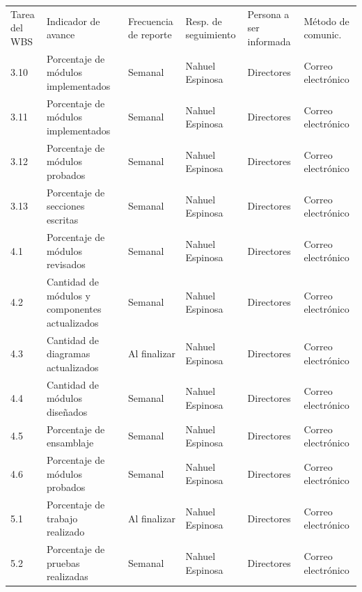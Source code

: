 \documentclass[11pt]{charter}
\begin{document}
\begin{table}[!htpb]
\centering
\begin{tabularx}{\linewidth}{@{}|m{1.5cm}|m{3cm}|X|X|X|X|@{}}
\hline
\rowcolor[HTML]{C0C0C0} 
\multicolumn{6}{|c|}{\cellcolor[HTML]{C0C0C0}SEGUIMIENTO DE AVANCE} \\ \hline
\rowcolor[HTML]{C0C0C0} 
Tarea del WBS & Indicador de avance & Frecuencia de reporte & Resp. de seguimiento & Persona a ser informada & Método de comunic. \\ \hline
 3.10 & Porcentaje de módulos implementados                & Semanal      & Nahuel Espinosa & Directores & Correo electrónico \\ \hline
 3.11 & Porcentaje de módulos implementados              & Semanal      & Nahuel Espinosa & Directores & Correo electrónico \\ \hline
 3.12 & Porcentaje de módulos probados                   & Semanal      & Nahuel Espinosa & Directores & Correo electrónico \\ \hline
 3.13 & Porcentaje de secciones escritas                 & Semanal      & Nahuel Espinosa & Directores & Correo electrónico \\ \hline
 4.1  & Porcentaje de módulos revisados                  & Semanal      & Nahuel Espinosa & Directores & Correo electrónico \\ \hline
 4.2  & Cantidad de módulos y componentes actualizados   & Semanal      & Nahuel Espinosa & Directores & Correo electrónico \\ \hline
 4.3  & Cantidad de diagramas actualizados               & Al finalizar & Nahuel Espinosa & Directores & Correo electrónico \\  \hline
 4.4  & Cantidad de módulos diseñados                    & Semanal      & Nahuel Espinosa & Directores & Correo electrónico \\ \hline
 4.5  & Porcentaje de ensamblaje                         & Semanal      & Nahuel Espinosa & Directores & Correo electrónico \\  \hline
 4.6  & Porcentaje de módulos probados                   & Semanal      & Nahuel Espinosa & Directores & Correo electrónico \\ \hline
 5.1  & Porcentaje de trabajo realizado                  & Al finalizar & Nahuel Espinosa & Directores & Correo electrónico \\ \hline
 5.2  & Porcentaje de pruebas realizadas                 & Semanal      & Nahuel Espinosa & Directores & Correo electrónico \\ \hline

\end{tabularx}
\end{table}
\end{document}
